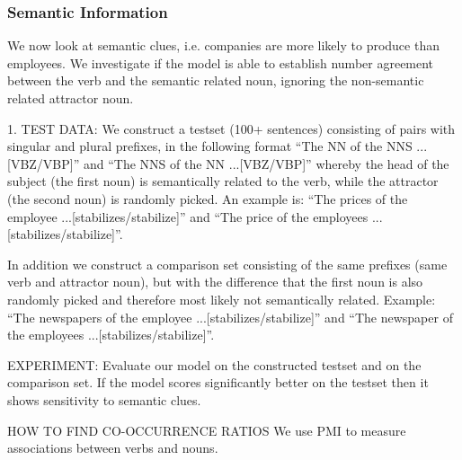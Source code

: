 \subsubsection{Semantic Information}

We now look at semantic clues, i.e. companies
are more likely to produce than employees.
We investigate if the model is able to establish
number agreement between the verb and the semantic related noun,
ignoring the non-semantic related attractor noun.
  
1. TEST DATA:
We construct a testset (100+ sentences) consisting of pairs with singular and plural prefixes, in the following format  
``The NN of the NNS ...[VBZ/VBP]'' and
``The NNS of the NN ...[VBZ/VBP]'' 
whereby the head of the subject (the first noun)
is semantically related to the verb, while the attractor (the second noun)
is randomly picked. An example is:
``The prices of the employee ...[stabilizes/stabilize]'' and 
``The price of the employees ...[stabilizes/stabilize]''.

In addition we construct a comparison set consisting of the same prefixes
(same verb and attractor noun),
but with the difference that the first noun is also randomly picked and
therefore most likely not semantically related. Example:
``The newspapers of the employee ...[stabilizes/stabilize]'' and 
``The newspaper of the employees ...[stabilizes/stabilize]''.


EXPERIMENT:
Evaluate our model on the constructed testset and on the comparison set.
If the model scores significantly better on the testset
then it shows sensitivity to semantic clues.


HOW TO FIND CO-OCCURRENCE RATIOS
We use PMI to measure associations between verbs and nouns.


